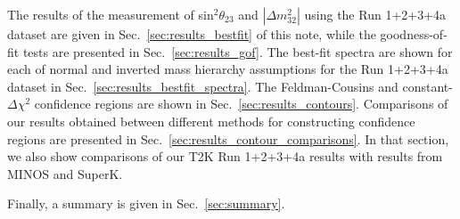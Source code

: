 The results of the measurement of sin$^{2}\theta_{23}$ and $|\Delta m^{2}_{32}|$ 
using the Run 1+2+3+4a dataset are given in Sec.\ \ref{sec:results_bestfit} of this note, 
while the goodness-of-fit tests are presented in Sec.\ \ref{sec:results_gof}.
The best-fit spectra are shown for each of normal and inverted mass hierarchy assumptions for the Run 1+2+3+4a dataset
in Sec.\ \ref{sec:results_bestfit_spectra}.
The Feldman-Cousins and constant-$\Delta\chi^{2}$ confidence regions are shown in Sec.\ \ref{sec:results_contours}. 
Comparisons of our results obtained between different methods for constructing confidence regions are presented in Sec.\ \ref{sec:results_contour_comparisons}.
In that section, we also show comparisons of our T2K Run 1+2+3+4a results with results from MINOS and SuperK.

Finally, a summary is given in Sec.\ \ref{sec:summary}.  


